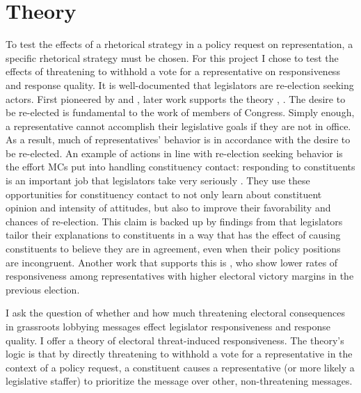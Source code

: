 \documentclass[12pt]{article}
\begin{document}
\section{Theory}
To test the effects of a rhetorical strategy in a policy request on representation, a specific rhetorical strategy must be chosen. For this project I chose to test the effects of threatening to withhold a vote for a representative on responsiveness and response quality.
It is well-documented that legislators are re-election seeking actors. First pioneered by \cite{mayhew1974congress} and \cite{Fenno:1973aa}, later work supports the theory \citep{Fiorina:1974aa}, \citep{Kingdon:1989aa}. The desire to be re-elected is fundamental to the work of members of Congress. Simply enough, a representative cannot accomplish their legislative goals if they are not in office. As a result, much of representatives' behavior is in accordance with the desire to be re-elected. An example of actions in line with re-election seeking behavior is the effort MCs put into handling constituency contact: responding to constituents is an important job that legislators take very seriously \citep{fenno1978home, Frantzich:1986aa, CMF:2011aa}. They use these opportunities for constituency contact to not only learn about constituent opinion and intensity of attitudes, but also to improve their favorability and chances of re-election. This claim is backed up by findings from \cite{Grose:2015aa} that legislators tailor their explanations to constituents in a way that has the effect of causing constituents to believe they are in agreement, even when their policy positions are incongruent. Another work that supports this is \cite{Dropp-Peskowitz2012a}, who show lower rates of responsiveness among representatives with higher electoral victory margins in the previous election.

I ask the question of whether and how much threatening electoral consequences in grassroots lobbying messages effect legislator responsiveness and response quality. I offer a theory of electoral threat-induced responsiveness. The theory's logic is that by directly threatening to withhold a vote for a representative in the context of a policy request, a constituent causes a representative (or more likely a legislative staffer) to prioritize the message over other, non-threatening messages.

\end{document}
